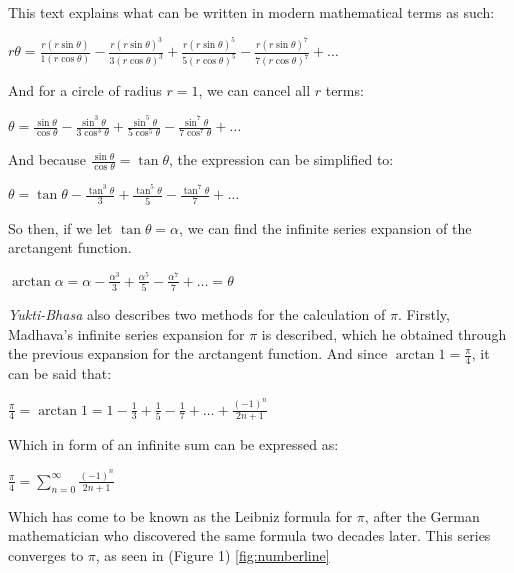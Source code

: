 

This text explains what can be written in modern mathematical terms as such:

$r \theta = \frac{r (r \sin{\theta})}{1 (r \cos{\theta})} - \frac{r (r \sin{\theta})^3}{3 (r \cos{\theta})^3} + \frac{r (r \sin{\theta})^5}{5 (r \cos{\theta})^5} - \frac{r (r \sin{\theta})^7}{7 (r \cos{\theta})^7} + \dots$

And for a circle of radius $r = 1$, we can cancel all $r$ terms:

$\theta = \frac{\sin{\theta}}{\cos{\theta}} - \frac{\sin^3{\theta}}{3 \cos^3{\theta}} + \frac{\sin^5{\theta}}{5 \cos^5{\theta}} - \frac{\sin^7{\theta}}{7 \cos^7{\theta}} + \dots$

And because $\frac{\sin{\theta}}{\cos{\theta}} = \tan{\theta}$, the expression
can be simplified to:

$\theta = \tan{\theta} - \frac{\tan^3{\theta}}{3} + \frac{\tan^5{\theta}}{5} - \frac{\tan^7{\theta}}{7} + \dots$

So then, if we let $\tan{\theta} = \alpha$, we can find the infinite series expansion
of the arctangent function.

$\arctan{\alpha} = \alpha - \frac{\alpha^3}{3} + \frac{\alpha^5}{5} - \frac{\alpha^7}{7} + \dots = \theta$

\textit{Yukti-Bhasa} also describes two methods for the calculation of $\pi$. Firstly, Madhava's infinite series expansion for $\pi$ is described, which he obtained through the previous expansion for the arctangent function. And since $\arctan{1} = \frac{\pi}{4}$, it can be said that:

$\frac{\pi}{4} = \arctan{1} = 1 - \frac{1}{3} + \frac{1}{5} - \frac{1}{7} + \dots + \frac{(-1)^n}{2n +1}$

Which in form of an infinite sum can be expressed as:

$\frac{\pi}{4} = \sum\limits_{n=0}^\infty \frac{(-1)^n}{2n +1}$

Which has come to be known as the Leibniz formula for $\pi$, after the German mathematician who discovered the same formula two decades later. \cite{edwards_1994} This series converges to $\pi$, as seen in (Figure 1) \ref{fig:numberline}


